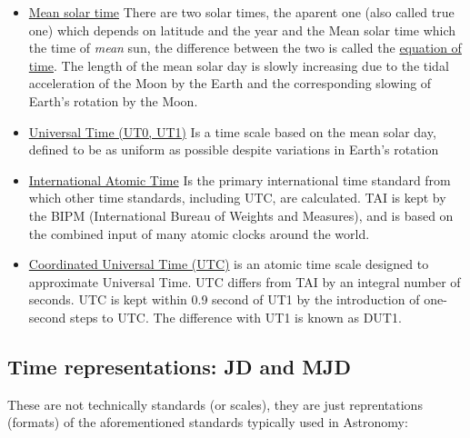 \documentclass[
  letterpaper,
  DIV=11,
  numbers=noendperiod]{scrreprt}
\begin{document}
\begin{itemize}
\item
  \href{http://en.wikipedia.org/wiki/Solar_time\#Mean_solar_time}{Mean
  solar time} There are two solar times, the aparent one (also called
  true one) which depends on latitude and the year and the Mean solar
  time which the time of \emph{mean} sun, the difference between the two
  is called the
  \href{http://en.wikipedia.org/wiki/Solar_time\#mediaviewer/File:Equation_of_time.svg}{equation
  of time}. The length of the mean solar day is slowly increasing due to
  the tidal acceleration of the Moon by the Earth and the corresponding
  slowing of Earth's rotation by the Moon.
\item
  \href{http://en.wikipedia.org/wiki/Universal_Time}{Universal Time
  (UT0, UT1)} Is a time scale based on the mean solar day, defined to be
  as uniform as possible despite variations in Earth's rotation
\item
  \href{http://en.wikipedia.org/wiki/International_Atomic_Time}{International
  Atomic Time} Is the primary international time standard from which
  other time standards, including UTC, are calculated. TAI is kept by
  the BIPM (International Bureau of Weights and Measures), and is based
  on the combined input of many atomic clocks around the world.
\item
  \href{http://en.wikipedia.org/wiki/Coordinated_Universal_Time}{Coordinated
  Universal Time (UTC)} is an atomic time scale designed to approximate
  Universal Time. UTC differs from TAI by an integral number of seconds.
  UTC is kept within 0.9 second of UT1 by the introduction of one-second
  steps to UTC. The difference with UT1 is known as DUT1.
\end{itemize}

\subsection*{Time representations: JD and
MJD}\label{time-representations-jd-and-mjd}

These are not technically standards (or scales), they are just
reprentations (formats) of the aforementioned standards typically used
in Astronomy:
\end{document}

